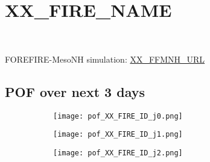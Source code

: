\vspace{-1em}
\section*{XX_FIRE_NAME}
\vspace{-1em}

\begin{figure}[H]
    \centering
    \begin{subfigure}[b]{0.3\textwidth}
        \centering
        \\[-4ex]
    \end{subfigure}
    \begin{subfigure}[b]{0.69\textwidth}
        \centering
    \end{subfigure}
\end{figure}
\vspace{-2em}
\small{ FOREFIRE-MesoNH simulation:  \url{XX_FFMNH_URL} }
\vspace{-1em}
\subsection*{POF over next 3 days}
\vspace{-1em}
\begin{figure}[H]
    \centering
    \begin{subfigure}[b]{0.31\textwidth}
        \centering
        \texttt{[image: pof\_XX\_FIRE\_ID\_j0.png]} %
    \end{subfigure}
    \begin{subfigure}[b]{0.31\textwidth}
        \centering
        \texttt{[image: pof\_XX\_FIRE\_ID\_j1.png]} %
    \end{subfigure}
    \begin{subfigure}[b]{0.36\textwidth}
        \centering
        \texttt{[image: pof\_XX\_FIRE\_ID\_j2.png]} %
    \end{subfigure}
\end{figure}



